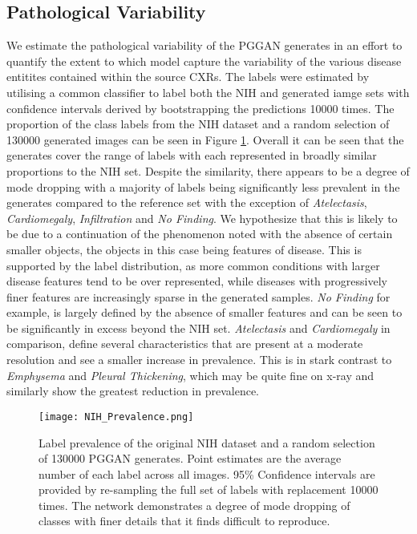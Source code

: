\documentclass{article}
\begin{document}
\subsection{Pathological Variability }
\label{sec:variability}
We estimate the pathological variability of the PGGAN generates in an effort to quantify the extent to which model capture the variability of the various disease entitites contained within the source CXRs. 
The labels were estimated by utilising a common classifier to label both the NIH and generated iamge sets with confidence intervals derived by bootstrapping the predictions \num{10000} times. The proportion of the class labels from the NIH dataset and a random selection of \num{130000} generated images can be seen in Figure \ref{fig:prevalence}. Overall it can be seen that the generates cover the range of labels with each represented in broadly similar proportions to the NIH set. Despite the similarity, there appears to be a degree of mode dropping with a majority of labels being significantly less prevalent in the generates compared to the reference set with the exception of \emph{Atelectasis}, \emph{Cardiomegaly}, \emph{Infiltration} and \emph{No Finding}. We hypothesize that this is likely to be due to a continuation of the phenomenon noted with the absence of certain smaller objects, the objects in this case being features of disease. This is supported by the label distribution, as more common conditions with larger disease features tend to be over represented, while diseases with progressively finer features are increasingly sparse in the generated samples. \emph{No Finding} for example, is largely defined by the absence of smaller features and can be seen to be significantly in excess beyond the NIH set. \emph{Atelectasis} and \emph{Cardiomegaly} in comparison, define several characteristics that are present at a moderate resolution and see a smaller increase in prevalence. This is in stark contrast to \emph{Emphysema} and \emph{Pleural Thickening}, which may be quite fine on x-ray and similarly show the greatest reduction in prevalence. 
\begin{figure}[!htb]
    \centering
    \texttt{[image: NIH\_Prevalence.png]}
    \caption{Label prevalence of the original NIH dataset and a random selection of \num{130000} PGGAN generates. Point estimates are the average number of each label across all images. 95\% Confidence intervals are provided by re-sampling the full set of labels with replacement \num{10000} times. The network demonstrates a degree of mode dropping of classes with finer details that it finds difficult to reproduce.}
    \label{fig:prevalence}
\end{figure}
\end{document}
